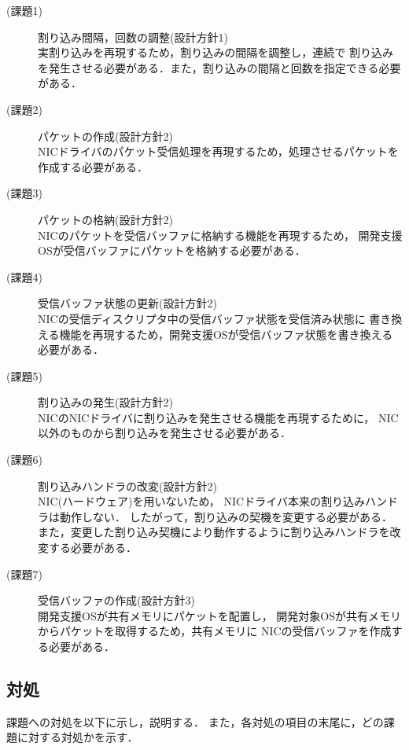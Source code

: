 \documentclass[submit,techreq,noauthor,dvipdfmx]{ipsj}
\begin{document}
\begin{description}
    \item[(課題1)] 割り込み間隔，回数の調整(設計方針1)\\
        実割り込みを再現するため，割り込みの間隔を調整し，連続で
        割り込みを発生させる必要がある．また，割り込みの間隔と回数を指定できる必要がある．
    \item[(課題2)] パケットの作成(設計方針2)\\
        NICドライバのパケット受信処理を再現するため，処理させるパケットを
        作成する必要がある．
    \item[(課題3)] パケットの格納(設計方針2)\\
        NICのパケットを受信バッファに格納する機能を再現するため，
        開発支援OSが受信バッファにパケットを格納する必要がある．
    \item[(課題4)] 受信バッファ状態の更新(設計方針2)\\
        NICの受信ディスクリプタ中の受信バッファ状態を受信済み状態に
        書き換える機能を再現するため，開発支援OSが受信バッファ状態を書き換える必要がある．
    \item[(課題5)] 割り込みの発生(設計方針2)\\
        NICのNICドライバに割り込みを発生させる機能を再現するために，
        NIC以外のものから割り込みを発生させる必要がある．
    \item[(課題6)] 割り込みハンドラの改変(設計方針2)\\
        NIC(ハードウェア)を用いないため，
        NICドライバ本来の割り込みハンドラは動作しない．
        したがって，割り込みの契機を変更する必要がある．
        また，変更した割り込み契機により動作するように割り込みハンドラを改変する必要がある．
    \item[(課題7)] 受信バッファの作成(設計方針3)\\
        開発支援OSが共有メモリにパケットを配置し，
        開発対象OSが共有メモリからパケットを取得するため，共有メモリに
        NICの受信バッファを作成する必要がある．
\end{description}

\subsection{対処}\label{sec:deal}

課題への対処を以下に示し，説明する．
また，各対処の項目の末尾に，どの課題に対する対処かを示す．
\end{document}
